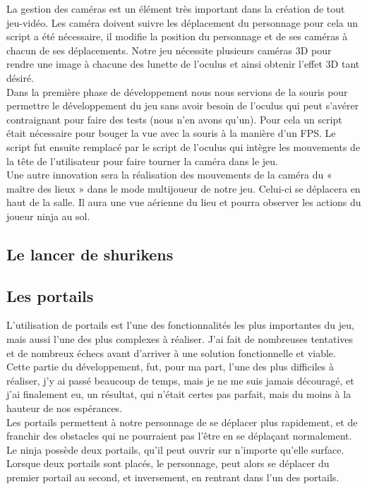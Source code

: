 \documentclass[12pt]{article}
\begin{document}
La gestion des caméras est un élément très important dans la création de tout jeu-vidéo. Les caméra doivent suivre les déplacement du personnage pour cela un script a été nécessaire, il modifie la position du personnage et de ses caméras à chacun de ses déplacements. Notre jeu nécessite plusieurs caméras 3D pour rendre une image à chacune des lunette de l’oculus et ainsi obtenir l’effet 3D tant désiré.\\
Dans la première phase de développement nous nous servions de la souris pour permettre le développement du jeu sans avoir besoin de l’oculus qui peut s’avérer contraignant pour faire des tests (nous n’en avons qu’un). Pour cela un script était nécessaire pour bouger la vue avec la souris à la manière d’un FPS. Le script fut ensuite remplacé par le script de l’oculus qui intègre les mouvements de la tête de l’utilisateur pour faire tourner la caméra dans le jeu.\\
Une autre innovation sera la réalisation des mouvements de la caméra du « maître des lieux » dans le mode multijoueur de notre jeu. Celui-ci se déplacera en haut de la salle. Il aura une vue aérienne du lieu et pourra observer les actions du joueur ninja au sol.


\subsection{Le lancer de shurikens}


\subsection{Les portails}

L'utilisation de portails est l'une des fonctionnalités les plus importantes du jeu, mais aussi l'une des plus complexes à réaliser. J'ai fait de nombreuses tentatives et de nombreux échecs avant d'arriver à une solution fonctionnelle et viable. Cette partie du développement, fut, pour ma part, l'une des plus difficiles à réaliser, j'y ai passé beaucoup de temps, mais je ne me suis jamais découragé, et j'ai finalement eu, un résultat, qui n'était certes pas parfait, mais du moins à la hauteur de nos espérances.\\
Les portails permettent à notre personnage de se déplacer plus rapidement, et de franchir des obstacles qui ne pourraient pas l'être en se déplaçant normalement. Le ninja possède deux portails, qu'il peut ouvrir sur n'importe qu'elle surface. Lorsque deux portails sont placés, le personnage, peut alors se déplacer du premier portail au second, et inversement, en rentrant dans l'un des portails.
\end{document}
